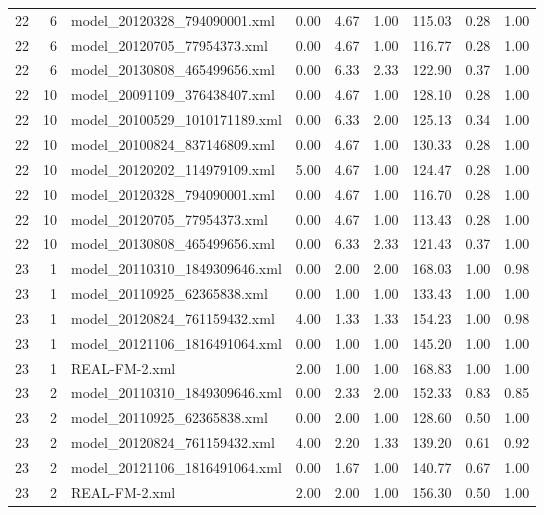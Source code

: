 \begin{table}[ht]
\begin{tabular}{rrlrrrrrr}
   22 &   6 & model\_20120328\_794090001.xml & 0.00 & 4.67 & 1.00 & 115.03 & 0.28 & 1.00 \\ 
   22 &   6 & model\_20120705\_77954373.xml & 0.00 & 4.67 & 1.00 & 116.77 & 0.28 & 1.00 \\ 
   22 &   6 & model\_20130808\_465499656.xml & 0.00 & 6.33 & 2.33 & 122.90 & 0.37 & 1.00 \\ 
   22 &  10 & model\_20091109\_376438407.xml & 0.00 & 4.67 & 1.00 & 128.10 & 0.28 & 1.00 \\ 
   22 &  10 & model\_20100529\_1010171189.xml & 0.00 & 6.33 & 2.00 & 125.13 & 0.34 & 1.00 \\ 
   22 &  10 & model\_20100824\_837146809.xml & 0.00 & 4.67 & 1.00 & 130.33 & 0.28 & 1.00 \\ 
   22 &  10 & model\_20120202\_114979109.xml & 5.00 & 4.67 & 1.00 & 124.47 & 0.28 & 1.00 \\ 
   22 &  10 & model\_20120328\_794090001.xml & 0.00 & 4.67 & 1.00 & 116.70 & 0.28 & 1.00 \\ 
   22 &  10 & model\_20120705\_77954373.xml & 0.00 & 4.67 & 1.00 & 113.43 & 0.28 & 1.00 \\ 
   22 &  10 & model\_20130808\_465499656.xml & 0.00 & 6.33 & 2.33 & 121.43 & 0.37 & 1.00 \\ 
   23 &   1 & model\_20110310\_1849309646.xml & 0.00 & 2.00 & 2.00 & 168.03 & 1.00 & 0.98 \\ 
   23 &   1 & model\_20110925\_62365838.xml & 0.00 & 1.00 & 1.00 & 133.43 & 1.00 & 1.00 \\ 
   23 &   1 & model\_20120824\_761159432.xml & 4.00 & 1.33 & 1.33 & 154.23 & 1.00 & 0.98 \\ 
   23 &   1 & model\_20121106\_1816491064.xml & 0.00 & 1.00 & 1.00 & 145.20 & 1.00 & 1.00 \\ 
   23 &   1 & REAL-FM-2.xml & 2.00 & 1.00 & 1.00 & 168.83 & 1.00 & 1.00 \\ 
   23 &   2 & model\_20110310\_1849309646.xml & 0.00 & 2.33 & 2.00 & 152.33 & 0.83 & 0.85 \\ 
   23 &   2 & model\_20110925\_62365838.xml & 0.00 & 2.00 & 1.00 & 128.60 & 0.50 & 1.00 \\ 
   23 &   2 & model\_20120824\_761159432.xml & 4.00 & 2.20 & 1.33 & 139.20 & 0.61 & 0.92 \\ 
   23 &   2 & model\_20121106\_1816491064.xml & 0.00 & 1.67 & 1.00 & 140.77 & 0.67 & 1.00 \\ 
   23 &   2 & REAL-FM-2.xml & 2.00 & 2.00 & 1.00 & 156.30 & 0.50 & 1.00 \\ 

\end{tabular}
\end{table}

